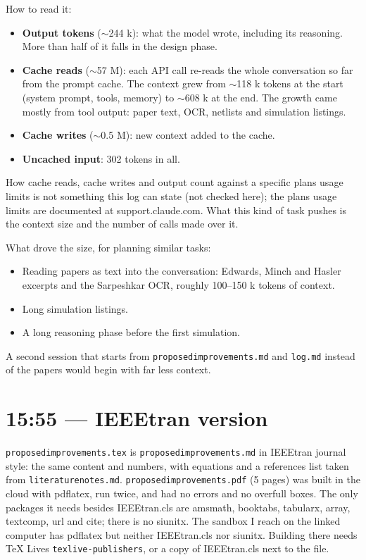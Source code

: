 \documentclass[11pt,a4paper]{article}
\providecommand{\tightlist}{\setlength{\itemsep}{0pt}\setlength{\parskip}{0pt}}
\renewcommand{\_}{\textunderscore\hspace{0pt}}
\begin{document}
How to read it:

\begin{itemize}
\tightlist
\item
  \textbf{Output tokens} ($\sim$244 k):
  what the model wrote, including its reasoning.
  More than half of it falls in the design phase.
\item
  \textbf{Cache reads} ($\sim$57 M): each
  API call re-reads the whole conversation so far
  from the prompt cache. The context grew from
  $\sim$118 k tokens at the start (system
  prompt, tools, memory) to $\sim$608 k
  at the end. The growth came mostly from tool
  output: paper text, OCR, netlists and simulation
  listings.
\item
  \textbf{Cache writes} ($\sim$0.5 M):
  new context added to the cache.
\item
  \textbf{Uncached input}: 302 tokens in all.
\end{itemize}

How cache reads, cache writes and output count
against a specific plan\textquotesingle s usage
limits is not something this log can state (not
checked here); the plans\textquotesingle{} usage
limits are documented at support.claude.com. What
this kind of task pushes is the context size and
the number of calls made over it.

What drove the size, for planning similar tasks:

\begin{itemize}
\tightlist
\item
  Reading papers as text into the conversation:
  Edwards, Minch and Hasler excerpts and the
  Sarpeshkar OCR, roughly 100--150 k tokens of
  context.
\item
  Long simulation listings.
\item
  A long reasoning phase before the first
  simulation.
\end{itemize}

A second session that starts from
\texttt{proposed\_improvements.md} and
\texttt{log.md} instead of the papers would begin
with far less context.

\hypertarget{1555--ieeetran-version}{%
\section{15:55 --- IEEEtran
version}\label{1555--ieeetran-version}}

\texttt{proposed\_improvements.tex} is
\texttt{proposed\_improvements.md} in IEEEtran
journal style: the same content and numbers, with
equations and a references list taken from
\texttt{literature\_notes.md}.
\texttt{proposed\_improvements.pdf} (5 pages) was
built in the cloud with pdflatex, run twice, and
had no errors and no overfull boxes. The only
packages it needs besides IEEEtran.cls are
amsmath, booktabs, tabularx, array, textcomp, url
and cite; there is no siunitx. The sandbox I reach
on the linked computer has pdflatex but neither
IEEEtran.cls nor siunitx. Building there needs TeX
Live\textquotesingle s
\texttt{texlive-publishers}, or a copy of
IEEEtran.cls next to the file.
\end{document}
